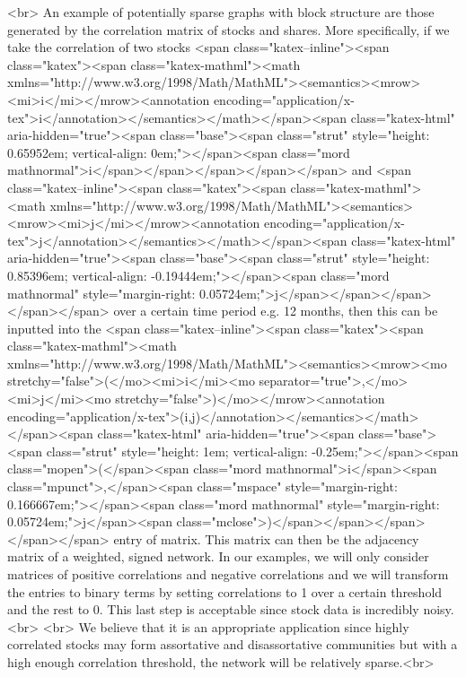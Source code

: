 \newline<br>
An example of potentially sparse graphs with block structure are those generated by the correlation matrix of stocks and shares. More specifically, if we take the correlation of two stocks <span class="katex--inline"><span class="katex"><span class="katex-mathml"><math xmlns="http://www.w3.org/1998/Math/MathML"><semantics><mrow><mi>i</mi></mrow><annotation encoding="application/x-tex">i</annotation></semantics></math></span><span class="katex-html" aria-hidden="true"><span class="base"><span class="strut" style="height: 0.65952em; vertical-align: 0em;"></span><span class="mord mathnormal">i</span></span></span></span></span> and <span class="katex--inline"><span class="katex"><span class="katex-mathml"><math xmlns="http://www.w3.org/1998/Math/MathML"><semantics><mrow><mi>j</mi></mrow><annotation encoding="application/x-tex">j</annotation></semantics></math></span><span class="katex-html" aria-hidden="true"><span class="base"><span class="strut" style="height: 0.85396em; vertical-align: -0.19444em;"></span><span class="mord mathnormal" style="margin-right: 0.05724em;">j</span></span></span></span></span> over a certain time period e.g. 12 months, then this can be inputted into the <span class="katex--inline"><span class="katex"><span class="katex-mathml"><math xmlns="http://www.w3.org/1998/Math/MathML"><semantics><mrow><mo stretchy="false">(</mo><mi>i</mi><mo separator="true">,</mo><mi>j</mi><mo stretchy="false">)</mo></mrow><annotation encoding="application/x-tex">(i,j)</annotation></semantics></math></span><span class="katex-html" aria-hidden="true"><span class="base"><span class="strut" style="height: 1em; vertical-align: -0.25em;"></span><span class="mopen">(</span><span class="mord mathnormal">i</span><span class="mpunct">,</span><span class="mspace" style="margin-right: 0.166667em;"></span><span class="mord mathnormal" style="margin-right: 0.05724em;">j</span><span class="mclose">)</span></span></span></span></span> entry of matrix. This matrix can then be the adjacency matrix of a weighted, signed network. In our examples, we will only consider matrices of positive correlations and negative correlations and we will transform the entries to binary terms by setting correlations to 1 over a certain threshold and the rest to 0. This last step is acceptable since stock data is incredibly noisy.<br>
\newline<br>
We believe that it is an appropriate application since highly correlated stocks may form assortative and disassortative communities but with a high enough correlation threshold, the network will be relatively sparse.<br>
